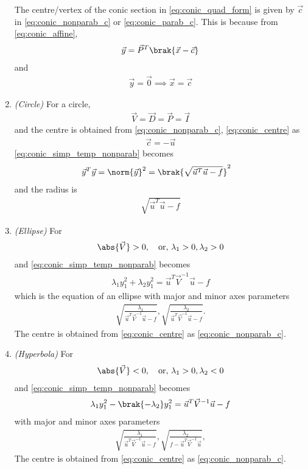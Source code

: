 \begin{enumerate}[label=\thesubsection.\arabic*.,ref=\thesubsection.\theenumi]
The centre/vertex of the conic section in \eqref{eq:conic_quad_form} is given by $\vec{c}$ in \eqref{eq:conic_nonparab_c} or \eqref{eq:conic_parab_c}.  This is because from \eqref{eq:conic_affine},
\begin{align}
\label{eq:conic_affine_inv}
\vec{y} = \vec{P}^T\brak{\vec{x}-\vec{c}}
\end{align}
and 
\begin{align}
\label{eq:conic_centre}
\vec{y} = \vec{0} \implies \vec{x}=\vec{c}
\end{align}
%
\item {\em (Circle)}
For a circle, 
\begin{align}
\vec{V}=\vec{D}= \vec{P} = \vec{I}
\end{align}
and the centre is obtained from \eqref{eq:conic_nonparab_c}, \eqref{eq:conic_centre}
as
\begin{align}
\label{eq:conic_circ_centre}
\vec{c} = -\vec{u}
\end{align}
\eqref{eq:conic_simp_temp_nonparab}
becomes
\begin{align}
\vec{y}^T\vec{y} &=  \norm{\vec{y}}^2=\brak{\sqrt{\vec{u}^T\vec{u} -f}}^2
\label{eq:conic_simp_temp_circ}
\end{align}
 and the radius is \begin{align} \sqrt{\vec{u}^T\vec{u} -f} \label{eq:conic_simp_temp_circ_rad} \end{align} 

\item {\em (Ellipse) } For \begin{align} \abs{\vec{V}} > 0, \quad \text{or, } \lambda_1 > 0, \lambda_2 > 0 
\end{align} and \eqref{eq:conic_simp_temp_nonparab} becomes \begin{align} \lambda_1y_1^2 +\lambda_2y_1^2 = 
\vec{u}^T\vec{V}^{-1}\vec{u} -f \end{align} which is the equation of an ellipse with major and minor axes 
parameters \begin{align} \sqrt{\frac{\lambda_1}{\vec{u}^T\vec{V}^{-1}\vec{u} -f}}, 
\sqrt{\frac{\lambda_2}{\vec{u}^T\vec{V}^{-1}\vec{u} -f}}. \end{align} The centre is obtained from 
\eqref{eq:conic_centre} as \eqref{eq:conic_nonparab_c}. 

\item {\em (Hyperbola)} For 
\begin{align} 
\label{eq:conic_hyper_cond}
\abs{\vec{V}} 
< 0, \quad \text{or, } \lambda_1 > 0, \lambda_2 < 0 \end{align} and \eqref{eq:conic_simp_temp_nonparab} becomes 
\begin{align} 
\lambda_1y_1^2 -\brak{-\lambda_2}y_1^2 = \vec{u}^T\vec{V}^{-1}\vec{u} -f 
\label{eq:quad_form_hyper}
\end{align} with major 
and minor axes parameters \begin{align} \sqrt{\frac{\lambda_1}{\vec{u}^T\vec{V}^{-1}\vec{u} -f}}, 
\sqrt{\frac{\lambda_2}{f-\vec{u}^T\vec{V}^{-1}\vec{u}}}, \end{align} The centre is obtained from 
\eqref{eq:conic_centre} as \eqref{eq:conic_nonparab_c}. 


\end{enumerate}
